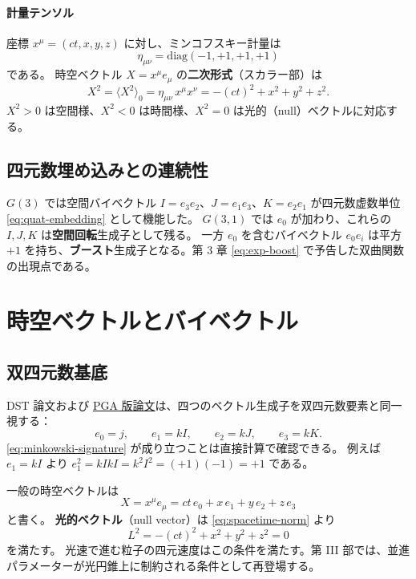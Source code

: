 \documentclass[dvipdfmx,a4paper,oneside]{jsbook}
\numberwithin{equation}{chapter}
\begin{document}
\paragraph{計量テンソル}
座標 \(x^\mu = (ct, x, y, z)\) に対し、ミンコフスキー計量は
\begin{equation}
  \eta_{\mu\nu} = \mathrm{diag}(-1, +1, +1, +1)
  \label{eq:minkowski-metric}
\end{equation}
である。
時空ベクトル \(X = x^\mu e_\mu\) の\textbf{二次形式}（スカラー部）は
\begin{equation}
  X^2 = \langle X^2 \rangle_0 = \eta_{\mu\nu}\, x^\mu x^\nu = -(ct)^2 + x^2 + y^2 + z^2.
  \label{eq:spacetime-norm}
\end{equation}
\(X^2 > 0\) は空間様、\(X^2 < 0\) は時間様、\(X^2 = 0\) は光的（null）ベクトルに対応する。

\subsection{四元数埋め込みとの連続性}

\(G(3)\) では空間バイベクトル \(I = e_3 e_2\)、\(J = e_1 e_3\)、\(K = e_2 e_1\) が四元数虚数単位 \eqref{eq:quat-embedding} として機能した。
\(G(3,1)\) では \(e_0\) が加わり、これらの \(I,J,K\) は\textbf{空間回転}生成子として残る。
一方 \(e_0\) を含むバイベクトル \(e_0 e_i\) は平方 \(+1\) を持ち、\textbf{ブースト}生成子となる。第 3 章 \eqref{eq:exp-boost} で予告した双曲関数の出現点である。

\section{時空ベクトルとバイベクトル}

\subsection{双四元数基底}

DST 論文および \hyperref[sec:sister-manuscripts]{PGA 版論文}は、四つのベクトル生成子を双四元数要素と同一視する：
\begin{equation}
  e_0 = j, \qquad e_1 = kI, \qquad e_2 = kJ, \qquad e_3 = kK.
  \label{eq:cl31-basis}
\end{equation}
\eqref{eq:minkowski-signature} が成り立つことは直接計算で確認できる。
例えば \(e_1 = kI\) より \(e_1^2 = kIkI = k^2 I^2 = (+1)(-1) = +1\) である。

一般の時空ベクトルは
\begin{equation}
  X = x^\mu e_\mu = ct\, e_0 + x\, e_1 + y\, e_2 + z\, e_3
  \label{eq:spacetime-vector}
\end{equation}
と書く。
\textbf{光的ベクトル}（null vector）は \eqref{eq:spacetime-norm} より
\begin{equation}
  L^2 = -(ct)^2 + x^2 + y^2 + z^2 = 0
  \label{eq:null-vector}
\end{equation}
を満たす。
光速で進む粒子の四元速度はこの条件を満たす。第 III 部では、並進パラメーターが光円錐上に制約される条件として再登場する。
\end{document}
